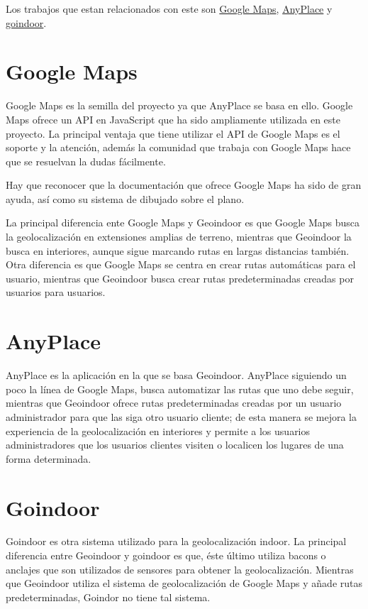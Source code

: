 
Los trabajos que estan relacionados con este son \href{https://www.google.es/maps}{Google Maps}, \href{https://anyplace.cs.ucy.ac.cy/}{AnyPlace} y \href{https://www.goindoor.co/}{goindoor}.

\section{Google Maps}\label{GoogleMaps}

Google Maps es la semilla del proyecto ya que AnyPlace se basa en ello.
Google Maps ofrece un API en JavaScript que ha sido ampliamente utilizada en este proyecto. La principal ventaja que tiene utilizar el API de Google Maps es el soporte y la atención, además la comunidad que trabaja con Google Maps hace que se resuelvan la dudas fácilmente. 

Hay que reconocer que la documentación que ofrece Google Maps ha sido de gran ayuda, así como su sistema de dibujado sobre el plano. 

La principal diferencia ente Google Maps y Geoindoor es que Google Maps busca la geolocalización en extensiones amplias de terreno, mientras que Geoindoor la busca en interiores, aunque sigue marcando rutas en largas distancias también. Otra diferencia es que Google Maps se centra en crear rutas automáticas para el usuario, mientras que Geoindoor busca crear rutas predeterminadas creadas por usuarios para usuarios.


\section{AnyPlace}\label{AnyPlace}

AnyPlace es la aplicación en la que se basa Geoindoor. AnyPlace siguiendo un poco la línea de Google Maps, busca automatizar las rutas que uno debe seguir, mientras que Geoindoor ofrece rutas predeterminadas creadas por un usuario administrador para que las siga otro usuario cliente; de esta manera se mejora la experiencia de la geolocalización en interiores y permite a los usuarios administradores que los usuarios clientes visiten o localicen los lugares de una forma determinada.

\section{Goindoor}\label{goindoor}

Goindoor es otra sistema utilizado para la geolocalización indoor. La principal diferencia entre Geoindoor y goindoor es que, éste último utiliza bacons o anclajes que son utilizados de sensores para obtener la geolocalización. Mientras que Geoindoor utiliza el sistema de geolocalización de Google Maps y añade rutas predeterminadas, Goindor no tiene tal sistema.
